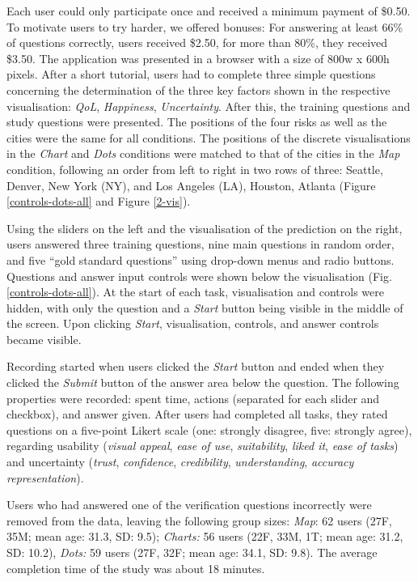 \documentclass[final,5p,times,twocolumn,authoryear]{elsarticle}
\begin{document}
Each user could only participate once and received a minimum payment of \$0.50. To motivate users to try harder, we offered bonuses: For answering at least 66\% of questions correctly, users received \$2.50, for more than 80\%, they received \$3.50. The application was presented in a browser with a size of 800w x 600h pixels. After a short tutorial, users had to complete three simple questions concerning the determination of the three key factors shown in the respective visualisation: \emph{QoL}, \emph{Happiness}, \emph{Uncertainty}. After this, the training questions and study questions were presented. The positions of the four risks as well as the cities were the same for all conditions. The positions of the discrete visualisations in the \emph{Chart} and \emph{Dots} conditions were matched to that of the cities in the \emph{Map} condition, following an order from left to right in two rows of three: Seattle, Denver, New York (NY), and Los Angeles (LA), Houston, Atlanta (Figure \ref{controls-dots-all}  and Figure \ref{2-vis}).

Using the sliders on the left and the visualisation of the prediction on the right, users answered three training questions, nine main questions in random order, and five ``gold standard questions'' using drop-down menus and radio buttons. Questions and answer input controls were shown below the visualisation (Fig.\ref{controls-dots-all}). At the start of each task, visualisation and controls were hidden, with only the question and a \emph{Start} button being visible in the middle of the screen. Upon clicking \emph{Start}, visualisation, controls, and answer controls became visible.

Recording started when users clicked the \emph{Start} button and ended when they clicked the \emph{Submit} button of the answer area below the question. The following properties were recorded: spent time, actions (separated for each slider and checkbox), and answer given. After users had completed all tasks, they rated questions on a five-point Likert scale (one: strongly disagree, five: strongly agree), regarding usability (\emph{visual appeal}, \emph{ease of use}, \emph{suitability}, \emph{liked it}, \emph{ease of tasks}) and uncertainty (\emph{trust}, \emph{confidence}, \emph{credibility}, \emph{understanding}, \emph{accuracy representation}).

Users who had answered one of the verification questions incorrectly were removed from the data, leaving the following group sizes: \emph{Map}: 62 users (27F, 35M; mean age: 31.3, SD: 9.5); \emph{Charts:} 56 users (22F, 33M, 1T; mean age: 31.2, SD: 10.2), \emph{Dots:} 59 users (27F, 32F; mean age: 34.1, SD: 9.8). The average completion time of the study was about 18 minutes.
\end{document}
